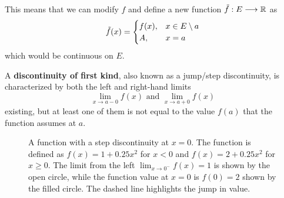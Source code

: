   This means that we can modify $f$ and define a new function $\Tilde{f}: E \longrightarrow \mathbb{R}$ as
  \begin{equation}
    \Tilde{f}(x) = \begin{cases} f(x), & x \in E \setminus a \\ A, & x = a \end{cases}
  \end{equation}
  which would be continuous on $E$. 

  \begin{definition}
    A \textbf{discontinuity of first kind}, also known as a jump/step discontinuity, is characterized by both the left and right-hand limits 
    \begin{equation}
      \lim_{x \rightarrow a-0} f(x) \text{ and } \lim_{x \rightarrow a+0} f(x)
    \end{equation}
    existing, but at least one of them is not equal to the value $f(a)$ that the function assumes at $a$. 

    \begin{figure}[H]
      \centering 
      \caption{A function with a step discontinuity at $x=0$. The function is defined as $f(x) = 1 + 0.25x^2$ for $x < 0$ and $f(x) = 2 + 0.25x^2$ for $x \geq 0$. The limit from the left $\lim_{x \to 0^-} f(x) = 1$ is shown by the open circle, while the function value at $x=0$ is $f(0) = 2$ shown by the filled circle. The dashed line highlights the jump in value.}
      \label{fig:step-discontinuity}
    \end{figure}
  \end{definition}

